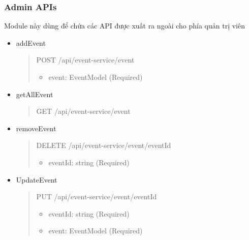\subsubsection{Admin APIs}
Module này dùng để chứa các API được xuất ra ngoài cho phía quản trị viên

\begin{itemize}
	\item addEvent
	      \begin{quote}
		      POST /api/event-service/event
		      \begin{itemize}
			      \item event: EventModel (Required)
		      \end{itemize}
	      \end{quote}

	\item getAllEvent
	      \begin{quote}
		      GET /api/event-service/event
	      \end{quote}

	\item removeEvent
	      \begin{quote}
		      DELETE /api/event-service/event/{eventId}
		      \begin{itemize}
			      \item eventId: string (Required)
		      \end{itemize}
	      \end{quote}

	\item UpdateEvent
	      \begin{quote}
		      PUT /api/event-service/event/{eventId}
		      \begin{itemize}
			      \item eventId: string (Required)
			      \item event: EventModel (Required)
		      \end{itemize}
	      \end{quote}
\end{itemize}

